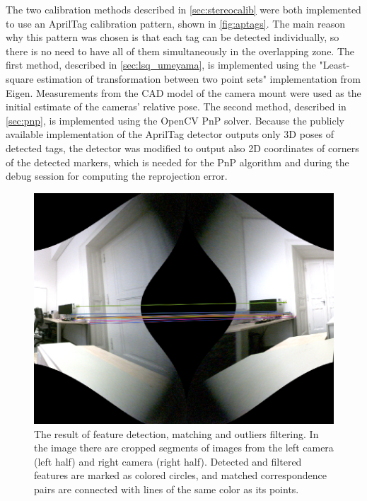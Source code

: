 The two calibration methods described in \autoref{sec:stereocalib} were both implemented to use an AprilTag calibration pattern, shown in \autoref{fig:aptags}.
The main reason why this pattern was chosen is that each tag can be detected individually, so there is no need to have all of them simultaneously in the overlapping zone.
The first method, described in \autoref{sec:lsq_umeyama}, is implemented using the "Least-square estimation of transformation between two point sets" \cite{Umeyama1991} implementation from Eigen.
Measurements from the CAD model of the camera mount were used as the initial estimate of the cameras' relative pose.
The second method, described in \autoref{sec:pnp}, is implemented using the OpenCV PnP solver.
Because the publicly available implementation of the AprilTag detector outputs only 3D poses of detected tags, the detector was modified to output also 2D coordinates of corners of the detected markers, which is needed for the PnP algorithm and during the debug session for computing the reprojection error.

\begin{figure}[ht]
  \centering
  \includegraphics[width=1\textwidth]{graphics/corresp.png}
  \caption[The result of features detection, matching and outliers filtering.]{The result of feature detection, matching and outliers filtering. In the image there are cropped segments of images from the left camera (left half) and right camera (right half). Detected and filtered features are marked as colored circles, and matched correspondence pairs are connected with lines of the same color as its points.}
  \label{fig:corresp_life}
\end{figure}

